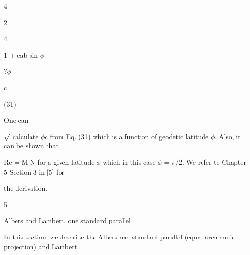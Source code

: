\documentclass[a4paper,portrait,12pt]{article}
\begin{document}
4


2


4


\begin{flushleft}
1 + eab sin $\phi$
\end{flushleft}





\begin{flushleft}
?$\phi$
\end{flushleft}





\begin{flushleft}
c
\end{flushleft}





(31)





\begin{flushleft}
One can
\end{flushleft}


\begin{flushleft}
$\surd$ calculate $\phi$c from Eq. (31) which is a function of geodetic latitude $\phi$. Also, it can be shown that
\end{flushleft}


\begin{flushleft}
Rc = M N for a given latitude $\phi$ which in this case $\phi$ = $\pi$/2. We refer to Chapter 5 Section 3 in [5] for
\end{flushleft}


\begin{flushleft}
the derivation.
\end{flushleft}





5





\begin{flushleft}
Albers and Lambert, one standard parallel
\end{flushleft}





\begin{flushleft}
In this section, we describe the Albers one standard parallel (equal-area conic projection) and Lambert
\end{flushleft}
\end{document}

